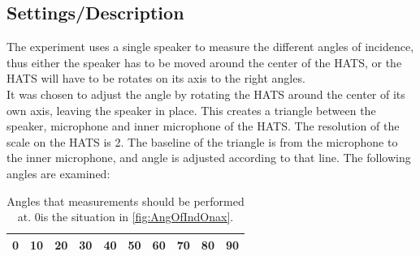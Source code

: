 \subsection{Settings/Description}\label{sec:AngleDescription}
The experiment uses a single speaker to measure the  different angles of incidence, thus either the speaker has to be moved around the center of the HATS, or the HATS will have to be rotates on its axis to the right angles. \\
It was chosen to adjust the angle by rotating the HATS around the center of its own axis, leaving the speaker in place. This creates a triangle between the speaker, microphone and inner microphone of the HATS. The resolution of the scale on the HATS is 2\degrees. The baseline of the triangle is from the microphone to the inner microphone, and angle is adjusted according to that line.
The following angles are examined:
\begin{table}[H]
	\centering
	\begin{tabular}{c c c c c c c c c c} \toprule
		0\degrees & 10\degrees & 20\degrees & 30\degrees & 40\degrees & 50\degrees & 60\degrees & 70\degrees & 80\degrees & 90\degrees \\ \bottomrule
	\end{tabular}
\label{Tab:AngleOfInciMeasAngles}
\caption{Angles that measurements should be performed at. 0\degrees  is the situation in \autoref{fig:AngOfIndOnax}.}
\end{table}
 

